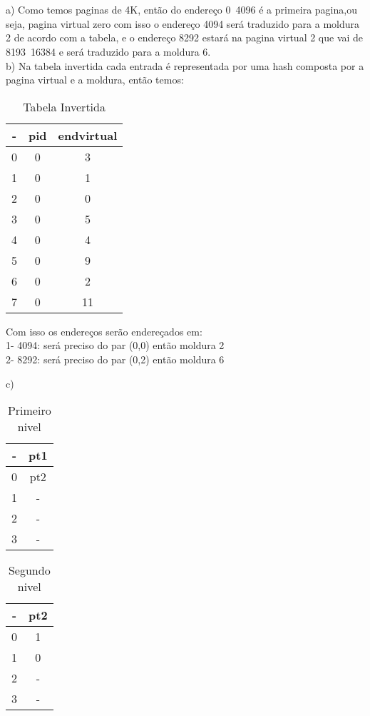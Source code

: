 \documentclass[12pt]{article}
\begin{document}
\section{} %
a) Como temos paginas de 4K, então do endereço 0~4096 é a primeira pagina,ou seja, pagina virtual zero com isso o endereço 4094 será traduzido para a moldura 2 de acordo com a tabela, e o endereço 8292 estará na pagina virtual 2 que vai de 8193~16384 e será traduzido para a moldura 6.
\\
b) Na tabela invertida cada entrada é representada por uma hash composta por a pagina virtual e a moldura, então temos:

\begin{table}[ht]
\centering
\caption{Tabela Invertida}
\vspace{0.5cm}
\begin{tabular}{c|c|c}
\hline   
\hline   
-&pid & endvirtual \\
\hline   
0 & 0 & 3 \\
1 & 0 & 1 \\
2 & 0 & 0 \\
3 & 0 & 5 \\
4 & 0 & 4 \\
5 & 0 & 9 \\
6 & 0 & 2 \\
7 & 0 & 11 \\
\hline   
\hline   
\end{tabular}
\end{table}

 Com isso os endereços serão endereçados em: \\
 1- 4094: será preciso do par (0,0) então moldura 2\\
 2- 8292: será preciso do par (0,2) então moldura 6

c) 

\begin{table}[ht]
\centering
\caption{Primeiro nivel}
\vspace{0.5cm}
\begin{tabular}{c|c}
\hline   
\hline   
- &pt1 \\
\hline   
0 & pt2 \\
1 & -\\
2 & - \\
3 & - \\
\hline   
\hline   
\end{tabular}
\end{table}

\begin{table}[ht]
\centering
\caption{Segundo nivel}
\vspace{0.5cm}
\begin{tabular}{c|c}
\hline   
\hline   
- &pt2 \\
\hline   
0 & 1 \\
1 & 0 \\
2 & - \\
3 & - \\
\hline   
\hline   
\end{tabular}
\end{table}
\end{document}
